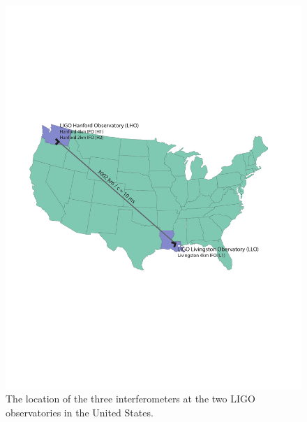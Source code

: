 \begin{figure}[p]
\begin{center}
\includegraphics[width=\linewidth]{figures/inspiral/observatories}
\end{center}
\caption[Location of LIGO Observatories]{%
\label{f:usmap}%
The location of the three interferometers at the two LIGO observatories in the
United States.
}
\end{figure}


